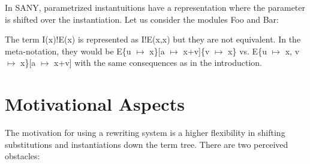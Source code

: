 \documentclass[a4paper]{article}
\newcommand{\tla}[1]{#1}
\begin{document}
In SANY, parametrized instantuitions have a representation where the
parameter is shifted over the instantiation. Let us consider the
modules Foo and Bar:

\begin{parcolumns}{2}
\end{parcolumns}

The term \tla{I(x)!E(x)} is represented as \tla{I!E(x,x)} but they are
not equivalent. In the meta-notation, they would be
E\{u $\mapsto$ x\}[a $\mapsto$ x+v]\{v $\mapsto$ x\} vs. E\{u $\mapsto$ x,
v $\mapsto$ x\}[a $\mapsto$ x+v] with the same consequences as in the
introduction.

\vspace{2cm}

\newpage
\appendix
\section{Motivational Aspects}
The motivation for using a rewriting system is a higher flexibility in shifting
 substitutions and instantiations down the term tree. There are two perceived
 obstacles:
\end{document}
